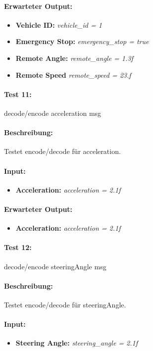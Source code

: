 \documentclass[a4paper, 12pt, titlepage]{scrartcl}
\begin{document}
{			\paragraph{Erwarteter Output:}
			\begin{itemize} \itemsep-0.5em
				\item \textbf{Vehicle ID:} \emph{vehicle\_id = 1}
				\item \textbf{Emergency Stop:} \emph{emergency\_stop = true}
				\item \textbf{Remote Angle:} \emph{remote\_angle = 1.3f}
				\item \textbf{Remote Speed} \emph{remote\_speed = 23.f}
			\end{itemize}
			
			\paragraph{Test 11:}{decode/encode acceleration msg}
			\paragraph{Beschreibung:} Testet encode/decode für acceleration.
			\paragraph{Input:}
			\begin{itemize} \itemsep-0.5em
				\item \textbf{Acceleration:} \emph{acceleration = 2.1f}
			\end{itemize}
			\paragraph{Erwarteter Output:}
			\begin{itemize} \itemsep-0.5em
				\item \textbf{Acceleration:} \emph{acceleration = 2.1f}
			\end{itemize}
			
			\paragraph{Test 12:}{decode/encode steeringAngle msg}
			\paragraph{Beschreibung:} Testet encode/decode für steeringAngle.
			\paragraph{Input:}
			\begin{itemize} \itemsep-0.5em
				\item \textbf{Steering Angle:} \emph{steering\_angle = 2.1f}
			\end{itemize}
}
\end{document}
